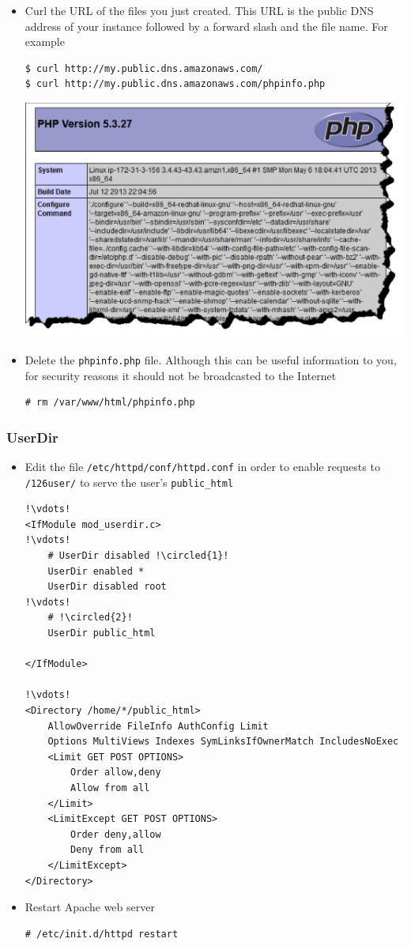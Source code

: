 \documentclass{beamer}
\newcommand*\circled[1]{\tikz[baseline=(char.base)]{
            \node[shape=circle,draw,inner sep=2pt] (char) {#1};}}
\begin{document}
\begin{frame}
\begin{itemize}
\item Curl the URL of the files you just created. This URL is the public DNS address of your instance followed by a forward slash and the file name. For example
\lstset{language=shell}
\begin{lstlisting}[escapechar=!]
$ curl http://my.public.dns.amazonaws.com/
$ curl http://my.public.dns.amazonaws.com/phpinfo.php
\end{lstlisting}


\includegraphics[width=0.5 \textwidth]{phpinfo.eps}

\item Delete the \texttt{phpinfo.php} file. Although this can be useful information to you, for security reasons it should not be broadcasted to the Internet

\lstset{language=shell}
\begin{lstlisting}[escapechar=&]
# rm /var/www/html/phpinfo.php
\end{lstlisting}

\end{itemize}
\end{frame}
\begin{frame}
\frametitle{UserDir }
\begin{itemize}
 \item Edit the file \texttt{/etc/httpd/conf/httpd.conf} in order to enable requests to \texttt{/\char126user/} to serve the user's \texttt{public\_html}



\lstset{language=shell,numbers=left}
\begin{lstlisting}[escapechar=!]
!\vdots!
<IfModule mod_userdir.c>
!\vdots!
    # UserDir disabled !\circled{1}!
    UserDir enabled *
    UserDir disabled root
!\vdots!
    # !\circled{2}!
    UserDir public_html

</IfModule>

!\vdots!
<Directory /home/*/public_html>
    AllowOverride FileInfo AuthConfig Limit
    Options MultiViews Indexes SymLinksIfOwnerMatch IncludesNoExec
    <Limit GET POST OPTIONS>
        Order allow,deny
        Allow from all
    </Limit>
    <LimitExcept GET POST OPTIONS>
        Order deny,allow
        Deny from all
    </LimitExcept>
</Directory>
\end{lstlisting}

\item Restart Apache web server

\lstset{language=shell}
\begin{lstlisting}[escapechar=&]
# /etc/init.d/httpd restart
\end{lstlisting}

\end{itemize}
\end{frame}
\end{document}
